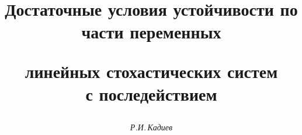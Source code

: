 









\newcommand{\col}{\operatorname{col}}


\newcommand{\tts}[1]{}







\setcounter{page}{75}















\author{\it Р.И.\,Кадиев}




\title{Достаточные условия устойчивости по части переменных


линейных стохастических систем\\ с последействием}





\date{}




\pagestyle{plain} %







\maketitle


